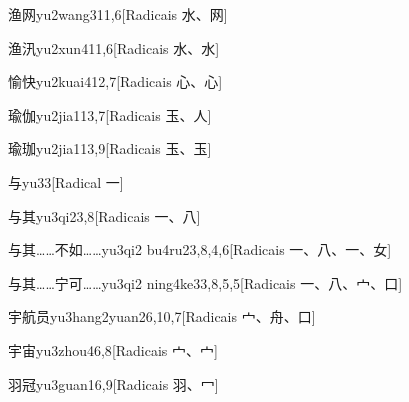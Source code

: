 \begin{entry}{渔网}{yu2wang3}{11,6}[Radicais ⽔、⽹]
\end{entry}

\begin{entry}{渔汛}{yu2xun4}{11,6}[Radicais ⽔、⽔]
\end{entry}

\begin{entry}{愉快}{yu2kuai4}{12,7}[Radicais ⼼、⼼]
\end{entry}

\begin{entry}{瑜伽}{yu2jia1}{13,7}[Radicais ⽟、⼈]
\end{entry}

\begin{entry}{瑜珈}{yu2jia1}{13,9}[Radicais ⽟、⽟]
\end{entry}

\begin{entry}{与}{yu3}{3}[Radical ⼀]
\end{entry}

\begin{entry}{与其}{yu3qi2}{3,8}[Radicais ⼀、⼋]
\end{entry}

\begin{entry}{与其……不如……}{yu3qi2 bu4ru2}{3,8,4,6}[Radicais ⼀、⼋、⼀、⼥]
\end{entry}

\begin{entry}{与其……宁可……}{yu3qi2 ning4ke3}{3,8,5,5}[Radicais ⼀、⼋、⼧、⼝]
\end{entry}

\begin{entry}{宇航员}{yu3hang2yuan2}{6,10,7}[Radicais ⼧、⾈、⼝]
\end{entry}

\begin{entry}{宇宙}{yu3zhou4}{6,8}[Radicais ⼧、⼧]
\end{entry}

\begin{entry}{羽冠}{yu3guan1}{6,9}[Radicais ⽻、⼍]
\end{entry}

